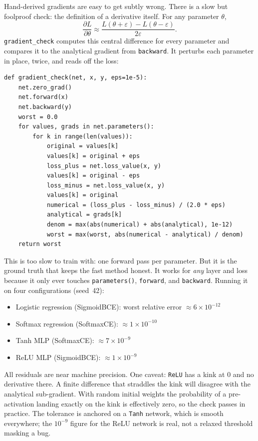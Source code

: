 Hand-derived gradients are easy to get subtly wrong. There is a slow but
foolproof check: the definition of a derivative itself. For any parameter
$\theta$,
\[
  \frac{\partial L}{\partial \theta}
  \approx
  \frac{L(\theta + \varepsilon) - L(\theta - \varepsilon)}{2\varepsilon}.
\]
\texttt{gradient\_check} computes this central difference for every
parameter and compares it to the analytical gradient from
\texttt{backward}. It perturbs each parameter in place, twice, and reads
off the loss:

\begin{lstlisting}
def gradient_check(net, x, y, eps=1e-5):
    net.zero_grad()
    net.forward(x)
    net.backward(y)
    worst = 0.0
    for values, grads in net.parameters():
        for k in range(len(values)):
            original = values[k]
            values[k] = original + eps
            loss_plus = net.loss_value(x, y)
            values[k] = original - eps
            loss_minus = net.loss_value(x, y)
            values[k] = original
            numerical = (loss_plus - loss_minus) / (2.0 * eps)
            analytical = grads[k]
            denom = max(abs(numerical) + abs(analytical), 1e-12)
            worst = max(worst, abs(numerical - analytical) / denom)
    return worst
\end{lstlisting}

This is too slow to train with: one forward pass per parameter. But it is
the ground truth that keeps the fast method honest. It works for
\emph{any} layer and loss because it only ever touches
\texttt{parameters()}, \texttt{forward}, and \texttt{backward}. Running
it on four configurations (seed~42):

\begin{itemize}
\item Logistic regression (SigmoidBCE): worst relative error $\approx 6 \times 10^{-12}$
\item Softmax regression (SoftmaxCE): $\approx 1 \times 10^{-10}$
\item Tanh MLP (SoftmaxCE): $\approx 7 \times 10^{-9}$
\item ReLU MLP (SigmoidBCE): $\approx 1 \times 10^{-9}$
\end{itemize}

All residuals are near machine precision. One caveat: \texttt{ReLU} has a
kink at $0$ and no derivative there. A finite difference that straddles
the kink will disagree with the analytical sub-gradient. With random
initial weights the probability of a pre-activation landing exactly on
the kink is effectively zero, so the check passes in practice. The
tolerance is anchored on a \texttt{Tanh} network, which is smooth
everywhere; the $10^{-9}$ figure for the ReLU network is real, not a
relaxed threshold masking a bug.

